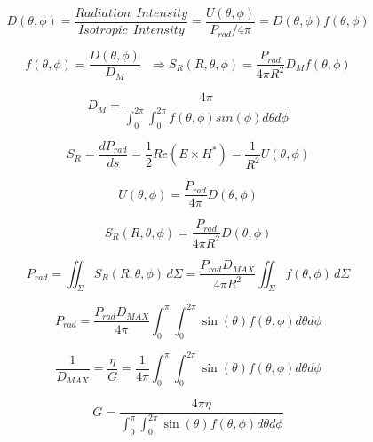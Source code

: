 \begin{equation}
	D ( \theta, \phi) = \frac {Radiation \ \ Intensity} {Isotropic \ \ Intensity } = \frac{ U(\theta , \phi)} {P_{rad}/ 4\pi} =  D(\theta , \phi) f(\theta , \phi) 
\end{equation}

\begin{equation}
	f(\theta,\phi)=\frac{ \textit{D}(\theta,\phi)}{D_M} \ \ \ \Longrightarrow S_R(R,\theta,\phi)= \frac{P_{rad}}{4\pi R^2} D_M f(\theta,\phi)
\end{equation}

\begin{equation}
	D_M=\frac{4 \pi }{ \int_0^{2\pi}\int_0^{2\pi} f(\theta,\phi)sin(\phi) d\theta d\phi}
\end{equation}

\begin{equation}
	S_R=\frac{dP_{rad}}{ds}=\frac{1}{2}Re(E\times H^*)=\frac{1}{R^2}\textit{U}(\theta,\phi)
\end{equation}

\begin{equation}
\textit{U}(\theta,\phi)= \frac{P_{rad}}{4\pi} \textit{D}(\theta, \phi)
\end{equation}

\begin{equation}
S_R(R,\theta,\phi)= \frac{P_{rad}}{4\pi R^2} \textit{D}(\theta, \phi)
\end{equation}

\begin{equation}
	P_{rad}= \iint_{\Sigma} S_R(R, \theta, \phi)\, d\Sigma = \frac{P_{rad}D_{MAX}}{4 \pi R^2}\iint_{\Sigma} f(\theta, \phi) \, d\Sigma
\end{equation}

\begin{equation}
	P_{rad} = \frac {P_{rad}D_{MAX}}{4 \pi}\int_0^{ \pi}\int_0^{2 \pi} \sin(\theta) f(\theta, \phi) d\theta d\phi
\end{equation}

\begin{equation}
	\frac{1}{D_{MAX}}=\frac{\eta}{G}= \frac{1}{4 \pi} \int_0^{\pi}\int_0^{2 \pi} \sin(\theta) f(\theta, \phi) d\theta d\phi
\end{equation}

\begin{equation}
	G =\frac { 4\pi \eta}{\int_0^{ \pi}\int_0^{2 \pi} \sin(\theta) f(\theta, \phi) d\theta d\phi}
\end{equation}

